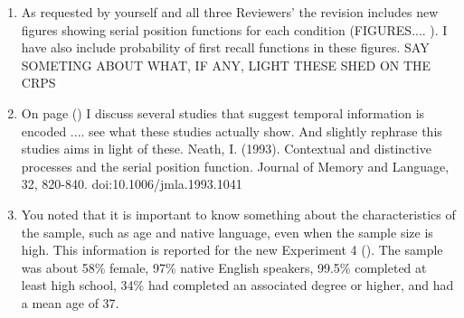\documentclass[12pt]{article}
\begin{document}
\begin{enumerate}
\item
	As requested by yourself and all three Reviewers' the revision includes new figures showing serial position functions for each condition (FIGURES.... \pageref{TODO-7}). I have also include probability of first recall functions in these figures. SAY SOMETING ABOUT WHAT, IF ANY, LIGHT THESE SHED ON THE CRPS

\item
	On page (\pageref{TODO-8}) I discuss several studies that suggest temporal information is encoded .... see what these studies actually show. And slightly rephrase this studies aims in light of these.
	Neath, I. (1993). Contextual and distinctive processes and the serial position function. Journal of Memory and Language, 32, 820-840. doi:10.1006/jmla.1993.1041

\item
	You noted that it is important to know something about the characteristics of the sample, such as age and native language, even when the sample size is high. This information is reported for the new Experiment 4 (\pageref{TODO-9}). The sample was about 58\% female, 97\% native English speakers, 99.5\% completed at least high school, 34\% had completed an associated degree or higher, and had a mean age of 37.


\end{enumerate}
\end{document}
